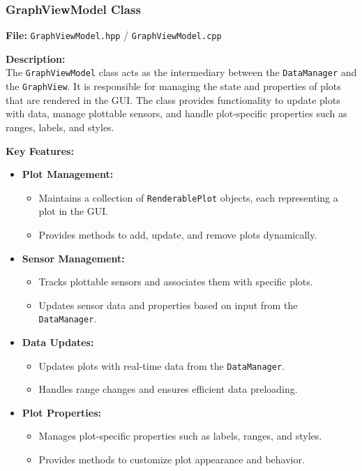 \documentclass{article}
\begin{document}
\vspace{10pt}
\subsubsection{GraphViewModel Class}
\textbf{File:} \texttt{GraphViewModel.hpp} / \texttt{GraphViewModel.cpp} 

\vspace{5pt}
\noindent
\textbf{Description:}
\\
\noindent
The \texttt{GraphViewModel} class acts as the intermediary between the \texttt{DataManager} and the \texttt{GraphView}. It is responsible for managing the state and properties of plots that are rendered in the GUI. The class provides functionality to update plots with data, manage plottable sensors, and handle plot-specific properties such as ranges, labels, and styles.

\vspace{5pt}
\noindent
\textbf{Key Features:}
\begin{itemize}
    \item \textbf{Plot Management:}
    \begin{itemize}
        \item Maintains a collection of \texttt{RenderablePlot} objects, each representing a plot in the GUI.

        \item Provides methods to add, update, and remove plots dynamically.
    \end{itemize}
    
    \item \textbf{Sensor Management:}
    \begin{itemize}
        \item Tracks plottable sensors and associates them with specific plots.

        \item Updates sensor data and properties based on input from the \texttt{DataManager}.
    \end{itemize}
    
    \item \textbf{Data Updates:}
    \begin{itemize}
        \item Updates plots with real-time data from the \texttt{DataManager}.

        \item Handles range changes and ensures efficient data preloading.
    \end{itemize}

    \item \textbf{Plot Properties:}
    \begin{itemize}
        \item Manages plot-specific properties such as labels, ranges, and styles.

        \item Provides methods to customize plot appearance and behavior.
    \end{itemize}
\end{itemize}
\end{document}
